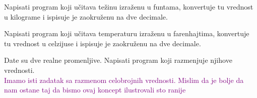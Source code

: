 \begin{Exercise}[label=p1.1_10b] 
Napisati program koji učitava težinu izraženu
   u funtama, konvertuje tu vrednost u kilograme i ispisuje je zaokruženu na dve decimale. 
\end{Exercise}

\begin{Exercise}[label=p1.1_10c] 
Napisati program koji učitava temperaturu izraženu
   u farenhajtima, konvertuje tu vrednost u celzijuse i ispisuje je zaokruženu na dve decimale. 
\end{Exercise}

\begin{comment}
\begin{Exercise}[label=p1.1_10] 
\komentar{Razbiti ovaj zadatak na tri zadatka i staviti da idu zajedno uz zadatak sa incima. *ODGOVOR: zadatak je razbijen* }
Napisati program koji:
\begin{itemize}
\item unetu dužinu u miljama konvertuje u kilometre (1 mi = 1.609344 km)
\item unetu težinu u funtama konvertuje u kilograme ( 1 lb = 0.45359237 kg)
\item unetu temperaturu u celzijusima konvertuje u farenhajte ($F=\frac{9\cdot C}{5}+32$)
\end{itemize}


\begin{maxitest}
\begin{upotreba}{1}
#\naslovInt#
#\izlaz{Unesite duzinu u miljama:}\ulaz{1.8}#
#\izlaz{Vrednost duzine u kilometrima je: 2.896819}#
#\izlaz{Unesite tezinu u funtama:}\ulaz{10}#
#\izlaz{Vrednost tezine u kilogramima je: 4.535923}#
#\izlaz{Unesite temperaturu u celzjusima:}\ulaz{37.2}#
#\izlaz{Vrednost temperature u farenhajtima je: 98.960007}#
\end{upotreba}
\end{maxitest}
\linkresenje{p1.1_10}
\end{Exercise}
\begin{Answer}[ref=p1.1_10]
\includecode{resenja/1_KontrolaToka/1.1_UvodniZadaci/praktikumi4/1_10.c}
\end{Answer}
\end{comment}


\begin{Exercise}[label=p1_12]
Date su dve realne promenljive. Napisati program koji razmenjuje njihove vrednosti. \\
\textcolor{purple}{Imamo isti zadatak sa razmenom celobrojnih vrednosti. Mislim da je bolje da nam ostane taj da bismo ovaj koncept ilustrovali sto ranije}
\end{Exercise}
\begin{Answer}[ref=p1_12]
\end{Answer}


